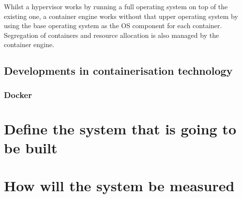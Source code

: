 Whilst a hypervisor works by running a full operating system on top of the existing one, a container engine works without that upper operating system by using the base operating system as the OS component for each container. Segregation of containers and resource allocation is also managed by the container engine.

\section{Developments in containerisation technology}

\subsection{Docker}



\chapter{Define the system that is going to be built}



\chapter{How will the system be measured}
